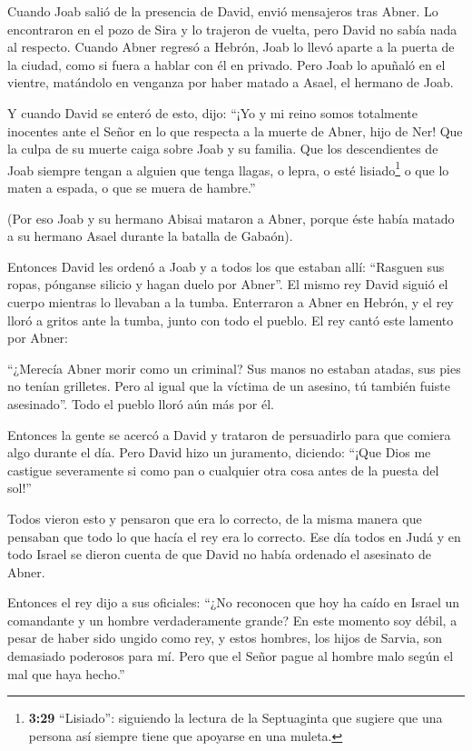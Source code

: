  Cuando Joab salió de la presencia de David, envió
mensajeros tras Abner. Lo encontraron en el pozo de Sira y lo trajeron
de vuelta, pero David no sabía nada al respecto.  Cuando
Abner regresó a Hebrón, Joab lo llevó aparte a la puerta de la ciudad,
como si fuera a hablar con él en privado. Pero Joab lo apuñaló en el
vientre, matándolo en venganza por haber matado a Asael, el hermano de
Joab.

 Y cuando David se enteró de esto, dijo: ``¡Yo y mi reino
somos totalmente inocentes ante el Señor en lo que respecta a la muerte
de Abner, hijo de Ner!  Que la culpa de su muerte caiga
sobre Joab y su familia. Que los descendientes de Joab siempre tengan a
alguien que tenga llagas, o lepra, o esté lisiado\footnote{\textbf{3:29}
  ``Lisiado'': siguiendo la lectura de la Septuaginta que sugiere que
  una persona así siempre tiene que apoyarse en una muleta.} o que lo
maten a espada, o que se muera de hambre.''

 (Por eso Joab y su hermano Abisai mataron a Abner, porque
éste había matado a su hermano Asael durante la batalla de Gabaón).

 Entonces David les ordenó a Joab y a todos los que estaban
allí: ``Rasguen sus ropas, pónganse silicio y hagan duelo por Abner''.
El mismo rey David siguió el cuerpo mientras lo llevaban a la tumba.
 Enterraron a Abner en Hebrón, y el rey lloró a gritos ante
la tumba, junto con todo el pueblo.  El rey cantó este
lamento por Abner:

``¿Merecía Abner morir como un criminal?  Sus manos no
estaban atadas, sus pies no tenían grilletes. Pero al igual que la
víctima de un asesino, tú también fuiste asesinado''. Todo el pueblo
lloró aún más por él.

 Entonces la gente se acercó a David y trataron de
persuadirlo para que comiera algo durante el día. Pero David hizo un
juramento, diciendo: ``¡Que Dios me castigue severamente si como pan o
cualquier otra cosa antes de la puesta del sol!''

 Todos vieron esto y pensaron que era lo correcto, de la
misma manera que pensaban que todo lo que hacía el rey era lo correcto.
 Ese día todos en Judá y en todo Israel se dieron cuenta de
que David no había ordenado el asesinato de Abner.

 Entonces el rey dijo a sus oficiales: ``¿No reconocen que
hoy ha caído en Israel un comandante y un hombre verdaderamente grande?
 En este momento soy débil, a pesar de haber sido ungido
como rey, y estos hombres, los hijos de Sarvia, son demasiado poderosos
para mí. Pero que el Señor pague al hombre malo según el mal que haya
hecho.''

